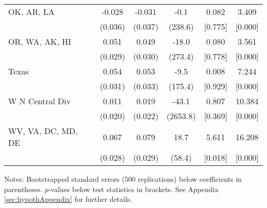 \begin{landscape}
\begin{table}[ht]
{\begin{threeparttable}
\begin{tabular}{lccccc}
OK, AR, LA & -0.028 & -0.031 & -0.1 & 0.082 & 3.409 \\ 
 & (0.036) & (0.037) & (238.6) & [0.775] & [0.000] \\ 
OR, WA, AK, HI & 0.051 & 0.049 & -18.0 & 0.080 & 3.561 \\ 
 & (0.029) & (0.030) & (273.4) & [0.778] & [0.000] \\ 
Texas & 0.054 & 0.053 & -9.5 & 0.008 & 7.244 \\ 
 & (0.031) & (0.033) & (175.4) & [0.929] & [0.000] \\ 
W N Central Div & 0.011 & 0.019 & -43.1 & 0.807 & 10.384 \\ 
 & (0.020) & (0.022) & (2653.8) & [0.369] & [0.000] \\ 
WV, VA, DC, MD, DE & 0.067 & 0.079 & 18.7 & 5.611 & 16.208 \\ 
 & (0.028) & (0.029) & (58.4) & [0.018] & [0.000] \\ 
\bottomrule
\end{tabular}
{\footnotesize {\raggedright Notes: Bootstrapped standard errors (500 replications) below coefficients in parentheses. $p$-values below test statistics in brackets. See Appendix \ref{sec:hypothAppendix} for further details.}}
\end{threeparttable}
}
\end{table}
\end{landscape}
